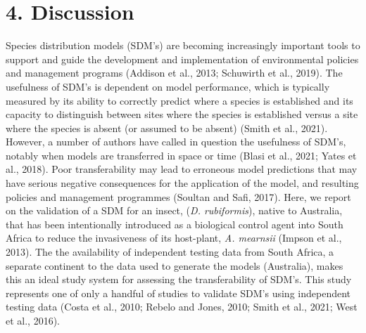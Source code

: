 \documentclass[12pt,]{article}
\begin{document}
\hypertarget{discussion}{%
\section{4. Discussion}\label{discussion}}

Species distribution models (SDM's) are becoming increasingly important
tools to support and guide the development and implementation of
environmental policies and management programs (Addison et al., 2013;
Schuwirth et al., 2019). The usefulness of SDM's is dependent on model
performance, which is typically measured by its ability to correctly
predict where a species is established and its capacity to distinguish
between sites where the species is established versus a site where the
species is absent (or assumed to be absent) (Smith et al., 2021).
However, a number of authors have called in question the usefulness of
SDM's, notably when models are transferred in space or time (Blasi et
al., 2021; Yates et al., 2018). Poor transferability may lead to
erroneous model predictions that may have serious negative consequences
for the application of the model, and resulting policies and management
programmes (Soultan and Safi, 2017). Here, we report on the validation
of a SDM for an insect, (\emph{D. rubiformis}), native to Australia,
that has been intentionally introduced as a biological control agent
into South Africa to reduce the invasiveness of its host-plant, \emph{A.
mearnsii} (Impson et al., 2013). The the availability of independent
testing data from South Africa, a separate continent to the data used to
generate the models (Australia), makes this an ideal study system for
assessing the transferability of SDM's. This study represents one of
only a handful of studies to validate SDM's using independent testing
data (Costa et al., 2010; Rebelo and Jones, 2010; Smith et al., 2021;
West et al., 2016).
\end{document}
